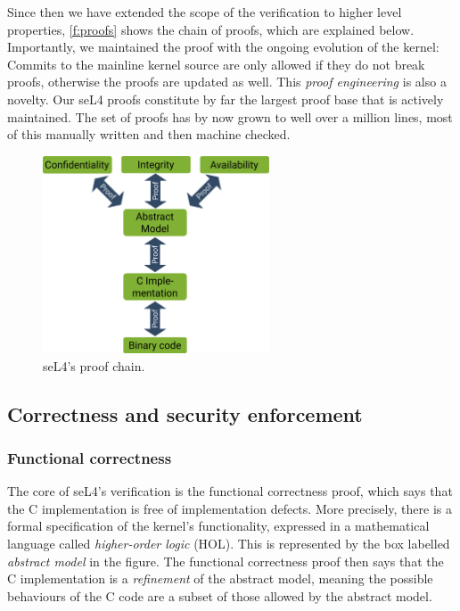 \documentclass[english,a4paper,12pt]{report}
\newcommand{\SSect}[1]{\subsection{#1}}
\newcommand{\SSSect}[1]{\subsubsection*{#1}}
\newcommand{\SSect}[1]{\section{#1}}
\newcommand{\SSSect}[1]{\subsection*{#1}}
\begin{document}
  Since then we have extended the scope of the verification to higher
  level properties, \autoref{f:proofs} shows the chain of proofs,
  which are explained below. Importantly, we maintained the proof with the
  ongoing evolution of the kernel: Commits to the mainline kernel
  source are only allowed if they do not break proofs, otherwise the proofs
  are updated as well. This \emph{proof engineering} is also a
  novelty. Our seL4 proofs constitute by
  far the largest proof base that is actively maintained. The set of proofs has by
  now grown to well over a million lines, most of this manually
  written and then machine checked.

  \begin{figure}[bh]
    \centering
    \includegraphics[width=0.6\textwidth]{proofs}
    \caption{seL4's proof chain.}
    \label{f:proofs}
  \end{figure}

  \SSect{Correctness and security enforcement}

  \SSSect{Functional correctness}

  The core of seL4's verification is the functional correctness proof, which says that the
  C implementation is free of implementation defects.
  More precisely, there is a formal
  specification of the kernel's functionality, expressed in a
  mathematical language called \emph{higher-order logic} (HOL). This
  is represented by the box labelled \emph{abstract model} in the
  figure. The functional correctness proof then says that the C
  implementation is a \emph{refinement} of the abstract model, meaning
  the possible behaviours of the C code are a subset of those allowed by the
  abstract model.
\end{document}
